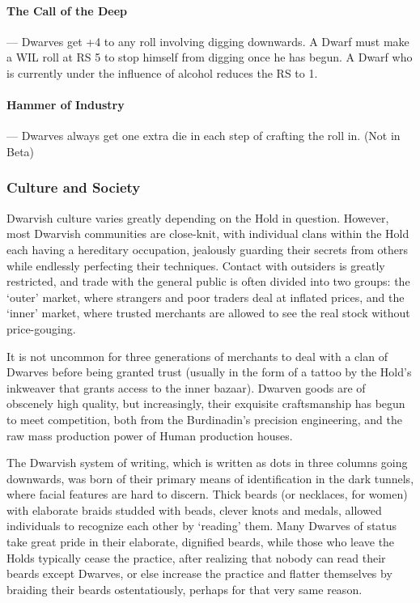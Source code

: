 \documentclass[oneside,11pt,english]{book}
\begin{document}
\paragraph{The Call of the Deep}---\quad
Dwarves get +4 to any roll involving digging downwards. A Dwarf must make a WIL roll at RS 5 
to stop himself from digging once he has begun. A Dwarf who is currently under the influence of 
alcohol reduces the RS to 1. 
\paragraph{Hammer of Industry}---\quad
Dwarves always get one extra die in each step of crafting the roll in. (Not in Beta) 
\subsubsection*{Culture and Society}
Dwarvish culture varies greatly depending on the Hold in question. However, most Dwarvish 
communities are close-knit, with individual clans within the Hold each having a hereditary occupation, 
jealously guarding their secrets from others while endlessly perfecting their techniques. Contact with 
outsiders is greatly restricted, and trade with the general public is often divided into two groups: the 
‘outer’ market, where strangers and poor traders deal at inflated prices, and the ‘inner’ market, where 
trusted merchants are allowed to see the real stock without price-gouging. 


It is not uncommon for three generations of merchants to deal with a clan of Dwarves before being 
granted trust (usually in the form of a tattoo by the Hold's inkweaver that grants access to the inner 
bazaar). Dwarven goods are of obscenely high quality, but increasingly, their exquisite craftsmanship has 
begun to meet competition, both from the Burdinadin's precision engineering, and the raw mass 
production power of Human production houses. 

 
The Dwarvish system of writing, which is written as dots in three columns going downwards, was born of 
their primary means of identification in the dark tunnels, where facial features are hard to discern. Thick 
beards (or necklaces, for women) with elaborate braids studded with beads, clever knots and medals, 
allowed individuals to recognize each other by ‘reading’ them. Many Dwarves of status take great pride 
in their elaborate, dignified beards, while those who leave the Holds typically cease the practice, after 
realizing that nobody can read their beards except Dwarves, or else increase the practice and flatter 
themselves by braiding their beards ostentatiously, perhaps for that very same reason. 
\end{document}
